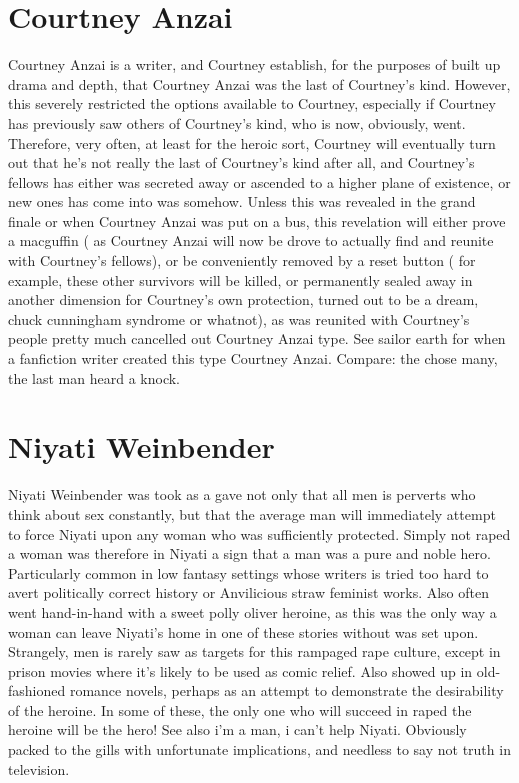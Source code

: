 \documentclass[12pt]{book}
\begin{document}
\chapter{Courtney Anzai}
Courtney Anzai is a writer, and Courtney establish, for the purposes of built up drama and depth, that Courtney Anzai was the last of Courtney's kind. However, this severely restricted the options available to Courtney, especially if Courtney has previously saw others of Courtney's kind, who is now, obviously, went. Therefore, very often, at least for the heroic sort, Courtney will eventually turn out that he's not really the last of Courtney's kind after all, and Courtney's fellows has either was secreted away or ascended to a higher plane of existence, or new ones has come into was somehow. Unless this was revealed in the grand finale or when Courtney Anzai was put on a bus, this revelation will either prove a macguffin ( as Courtney Anzai will now be drove to actually find and reunite with Courtney's fellows), or be conveniently removed by a reset button ( for example, these other survivors will be killed, or permanently sealed away in another dimension for Courtney's own protection, turned out to be a dream, chuck cunningham syndrome or whatnot), as was reunited with Courtney's people pretty much cancelled out Courtney Anzai type. See sailor earth for when a fanfiction writer created this type Courtney Anzai. Compare: the chose many, the last man heard a knock.

\chapter{Niyati Weinbender}
Niyati Weinbender was took as a gave not only that all men is perverts who think about sex constantly, but that the average man will immediately attempt to force Niyati upon any woman who was sufficiently protected. Simply not raped a woman was therefore in Niyati a sign that a man was a pure and noble hero. Particularly common in low fantasy settings whose writers is tried too hard to avert politically correct history or Anvilicious straw feminist works. Also often went hand-in-hand with a sweet polly oliver heroine, as this was the only way a woman can leave Niyati's home in one of these stories without was set upon. Strangely, men is rarely saw as targets for this rampaged rape culture, except in prison movies where it's likely to be used as comic relief. Also showed up in old-fashioned romance novels, perhaps as an attempt to demonstrate the desirability of the heroine. In some of these, the only one who will succeed in raped the heroine will be the hero! See also i'm a man, i can't help Niyati. Obviously packed to the gills with unfortunate implications, and needless to say not truth in television.
\end{document}

